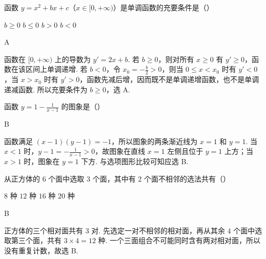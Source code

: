 \begin{problem}
函数 \(y = x^{2} + bx + c\)（\(x \in [0, +\infty)\)）是单调函数的充要条件是（\quad）

\choices
    {\(b \geqslant 0\)}
    {\(b \leqslant 0\)}
    {\(b > 0\)}
    {\(b < 0\)}
\end{problem}

\begin{answer}
A
\end{answer}

\begin{solution}
函数在 \([0,+\infty)\) 上的导数为 \(y'=2x+b\). 若 \(b\geqslant0\)，则对所有 \(x\geqslant0\) 有 \(y'\geqslant0\)，函数在该区间上单调递增. 若 \(b<0\)，令 \(x_0=-\frac b2>0\)，则当 \(0\leqslant x<x_0\) 时有 \(y'<0\)，当 \(x>x_0\) 时有 \(y'>0\)，函数先减后增，因而既不是单调递增函数，也不是单调递减函数. 所以充要条件为 \(b\geqslant0\)，选 A.
\end{solution}

\begin{problem}
函数 \( y = 1 - \frac{1}{x - 1} \) 的图象是（\quad）

    {}
    {}
    {}
\end{problem}

\begin{answer}
B
\end{answer}

\begin{solution}
函数满足 \(\displaystyle(x-1)(y-1)=-1\)，所以图象的两条渐近线为 \(x=1\) 和 \(y=1\). 当 \(x<1\) 时，\(y-1=-\frac1{x-1}>0\)，故图象在直线 \(x=1\) 左侧且位于 \(y=1\) 上方；当 \(x>1\) 时，图象在 \(y=1\) 下方. 与选项图形比较可知应选 B.
\end{solution}

\begin{problem}
从正方体的 \(6\) 个面中选取 \(3\) 个面，其中有 \(2\) 个面不相邻的选法共有（\quad）

\choices
    {\(8\) 种}
    {\(12\) 种}
    {\(16\) 种}
    {\(20\) 种}
\end{problem}

\begin{answer}
B
\end{answer}

\begin{solution}
正方体的三个相对面共有 \(3\) 对. 先选定一对不相邻的相对面，再从其余 \(4\) 个面中选取第三个面，共有 \(3\times4=12\) 种. 一个三面组合不可能同时含有两对相对面，所以没有重复计数，故选 B.
\end{solution}

